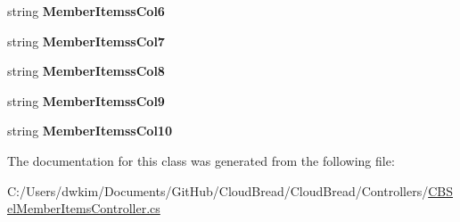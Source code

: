 \begin{DoxyCompactItemize}
\item 
string {\bfseries Member\+Itemss\+Col6}\hypertarget{class_cloud_bread_1_1_controllers_1_1_c_b_sel_member_items_controller_1_1_model_af0f62c0a080cb6b35693713ffe30cac3}{}\label{class_cloud_bread_1_1_controllers_1_1_c_b_sel_member_items_controller_1_1_model_af0f62c0a080cb6b35693713ffe30cac3}

\item 
string {\bfseries Member\+Itemss\+Col7}\hypertarget{class_cloud_bread_1_1_controllers_1_1_c_b_sel_member_items_controller_1_1_model_a4c70e5228ccc532301de868ae3ae5563}{}\label{class_cloud_bread_1_1_controllers_1_1_c_b_sel_member_items_controller_1_1_model_a4c70e5228ccc532301de868ae3ae5563}

\item 
string {\bfseries Member\+Itemss\+Col8}\hypertarget{class_cloud_bread_1_1_controllers_1_1_c_b_sel_member_items_controller_1_1_model_a5e742ebcf63ba6943145bef0ec504ccc}{}\label{class_cloud_bread_1_1_controllers_1_1_c_b_sel_member_items_controller_1_1_model_a5e742ebcf63ba6943145bef0ec504ccc}

\item 
string {\bfseries Member\+Itemss\+Col9}\hypertarget{class_cloud_bread_1_1_controllers_1_1_c_b_sel_member_items_controller_1_1_model_ae46978b7544ea230c4cc7e7e4dacc40f}{}\label{class_cloud_bread_1_1_controllers_1_1_c_b_sel_member_items_controller_1_1_model_ae46978b7544ea230c4cc7e7e4dacc40f}

\item 
string {\bfseries Member\+Itemss\+Col10}\hypertarget{class_cloud_bread_1_1_controllers_1_1_c_b_sel_member_items_controller_1_1_model_ab32b9af0092d9428cd2a582d8b3ed6fd}{}\label{class_cloud_bread_1_1_controllers_1_1_c_b_sel_member_items_controller_1_1_model_ab32b9af0092d9428cd2a582d8b3ed6fd}

\end{DoxyCompactItemize}


The documentation for this class was generated from the following file\+:\begin{DoxyCompactItemize}
\item 
C\+:/\+Users/dwkim/\+Documents/\+Git\+Hub/\+Cloud\+Bread/\+Cloud\+Bread/\+Controllers/\hyperlink{_c_b_sel_member_items_controller_8cs}{C\+B\+Sel\+Member\+Items\+Controller.\+cs}\end{DoxyCompactItemize}
